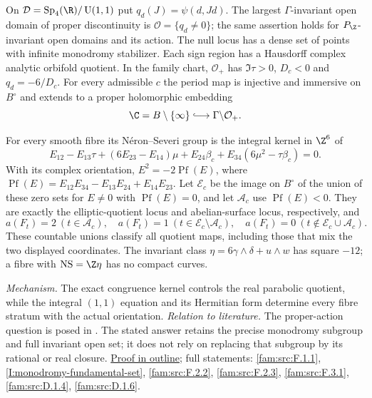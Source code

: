 On $\mathcal D=\operatorname{Sp}_4(\R)/\operatorname U(1,1)$ put
$q_d(J)=\psi(d,Jd)$.  The largest $\Gamma$-invariant open domain
of proper discontinuity is $\mathcal O=\{q_d\ne0\}$;
the same assertion holds for $P_\Z$-invariant open domains and
its action.  The null locus has a dense set of
points with infinite monodromy stabilizer.  Each sign region has
a Hausdorff complex analytic orbifold quotient.  In the family
chart, $\mathcal O_+$ has $\Im\tau>0$, $D_c<0$ and
$q_d=-6/D_c$.  For every admissible $c$ the period map is
injective and immersive on $B^\circ$ and extends to a proper
holomorphic embedding
\[
 \C=B\setminus\{\infty\}\lhook\joinrel\longrightarrow
 \Gamma\backslash\mathcal O_+.
\]

For every smooth fibre its N\'eron--Severi group is the integral
kernel in $\Z^6$ of
\[
 E_{12}-E_{13}\tau+(6E_{23}-E_{14})\mu+E_{24}\beta_c
             +E_{34}(6\mu^2-\tau\beta_c)=0.
\]
With its complex orientation,
$E^2=-2\operatorname{Pf}(E)$, where
$\operatorname{Pf}(E)=E_{12}E_{34}-E_{13}E_{24}+E_{14}E_{23}$.
Let $\mathcal E_c$ be the image on $B^\circ$ of the union of
these zero sets for $E\ne0$ with $\operatorname{Pf}(E)=0$,
and let $\mathcal A_c$ use $\operatorname{Pf}(E)<0$.
They are exactly the elliptic-quotient locus and abelian-surface
locus, respectively, and
\[
 a(F_t)=2\ (t\in\mathcal A_c),\quad
 a(F_t)=1\ (t\in\mathcal E_c\setminus\mathcal A_c),\quad
 a(F_t)=0\ (t\notin\mathcal E_c\cup\mathcal A_c).
\]
These countable unions classify all quotient maps, including
those that mix the two displayed coordinates.  The invariant
class $\eta=6\gamma\wedge\delta+u\wedge w$ has square $-12$;
a fibre with $\operatorname{NS}=\Z\eta$ has no compact curves.

\textit{Mechanism.} The exact congruence kernel controls the real
parabolic quotient, while the integral $(1,1)$ equation and its
Hermitian form determine every fibre stratum with the actual
orientation.
\textit{Relation to literature.} The proper-action question is
posed in \cite[Remark~8.4, pp.~23--24]{Engel2026}.  The stated
answer retains the precise monodromy subgroup and full invariant
open set; it does not rely on replacing that subgroup by its
rational or real closure.
\hyperlink{outline-I-C}{Proof in outline}; full statements:
\ref{fam:src:F.1.1}, \ref{I:monodromy-fundamental-set},
\ref{fam:src:F.2.2}, \ref{fam:src:F.2.3}, \ref{fam:src:F.3.1},
\ref{fam:src:D.1.4}, \ref{fam:src:D.1.6}.

\hypertarget{main-I-D}{}
